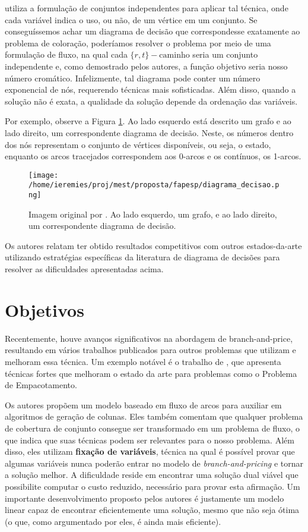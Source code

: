 \documentclass[11pt]{article}
\begin{document}
\textcite{Hoeve2021Graphcoloringdecision} utiliza a formulação de conjuntos independentes para aplicar tal técnica, onde cada variável indica o uso, ou não, de um vértice em um conjunto.
Se conseguíssemos achar um diagrama de decisão que correspondesse exatamente ao problema de coloração, poderíamos resolver o problema por meio de uma formulação de fluxo, na qual cada \(\{r,t\}-\text{caminho}\) seria um conjunto independente e, como demostrado pelos autores, a função objetivo seria nosso número cromático.
Infelizmente, tal diagrama pode conter um número exponencial de nós, requerendo técnicas mais sofisticadas.
Além disso, quando a solução não é exata, a qualidade da solução depende da ordenação das variáveis.

Por exemplo, observe a Figura \ref{fig:diagrama_decisao}.
Ao lado esquerdo está descrito um grafo e ao lado direito, um correspondente diagrama de decisão.
Neste, os números dentro dos nós representam o conjunto de vértices disponíveis, ou seja, o estado, enquanto os arcos tracejados correspondem aos 0-arcos e os contínuos, os 1-arcos.

\begin{figure}[htbp]
\centering
\texttt{[image: /home/ieremies/proj/mest/proposta/fapesp/diagrama\_decisao.png]}
\caption{\label{fig:diagrama_decisao}Imagem original por \textcite{Hoeve2021Graphcoloringdecision}. Ao lado esquerdo, um grafo, e ao lado direito, um correspondente diagrama de decisão.}
\end{figure}

Os autores relatam ter obtido resultados competitivos com outros estados-da-arte utilizando estratégias específicas da literatura de diagrama de decisões para resolver as dificuldades apresentadas acima.

\section{Objetivos}
\label{sec:org966206f}
Recentemente, houve avanços significativos na abordagem de branch-and-price, resultando em vários trabalhos publicados para outros problemas que utilizam e melhoram essa técnica.
Um exemplo notável é o trabalho de \textcite{Lima2022Exactsolutionnetwork}, que apresenta técnicas fortes que melhoram o estado da arte para problemas como o Problema de Empacotamento.

Os autores propõem um modelo baseado em fluxo de arcos para auxiliar em algoritmos de geração de colunas.
Eles também comentam que qualquer problema de cobertura de conjunto consegue ser transformado em um problema de fluxo, o que indica que suas técnicas podem ser relevantes para o nosso problema.
Além disso, eles utilizam \textbf{fixação de variáveis}, técnica na qual é possível provar que algumas variáveis nunca poderão entrar no modelo de \emph{branch-and-pricing} e tornar a solução melhor.
A dificuldade reside em encontrar uma solução dual viável que possibilite computar o custo reduzido, necessário para provar esta afirmação.
Um importante desenvolvimento proposto pelos autores é justamente um modelo linear capaz de encontrar eficientemente uma solução, mesmo que não seja ótima (o que, como argumentado por eles, é ainda mais eficiente).
\end{document}
